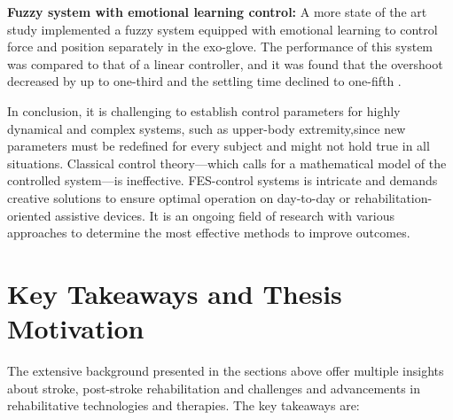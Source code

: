 \textbf{Fuzzy system with emotional learning control:} A more state of the art study implemented a fuzzy system equipped with emotional learning to control force and position separately in the exo-glove. The performance of this system was compared to that of a linear controller, and it was found that the overshoot decreased by up to one-third and the settling time declined to one-fifth \cite{FZC}.


In conclusion, it is challenging to establish control parameters for highly dynamical and complex systems, such as upper-body extremity,since new parameters must be redefined for every subject and might not hold true in all situations. Classical control theory—which calls for a mathematical model of the controlled system—is ineffective. FES-control systems is intricate and demands creative solutions to ensure optimal operation on day-to-day or rehabilitation-oriented assistive devices.  It is an ongoing field of research with various approaches to determine the most effective methods to improve outcomes.

\section{Key Takeaways and Thesis Motivation}

The extensive background presented in the sections above offer multiple insights about stroke, post-stroke rehabilitation and challenges and advancements in rehabilitative technologies and therapies. The key takeaways are:

